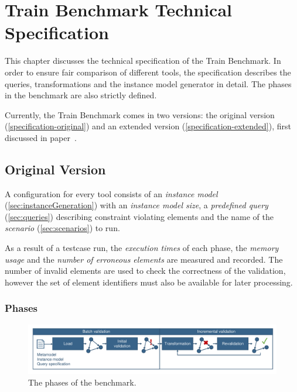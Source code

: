 \chapter{Train Benchmark Technical Specification}

This chapter discusses the technical specification of the Train Benchmark. In order to ensure fair comparison of different tools, the specification describes the queries, transformations and the instance model generator in detail. The phases in the benchmark are also strictly defined.

Currently, the Train Benchmark comes in two versions: the original version (\autoref{specification-original}) and an extended version (\autoref{specification-extended}), first discussed in paper~\cite{TB:ASE2013}.
 
\section{Original Version}
\label{specification-original}

A  configuration for every tool consists of an \emph{instance model} (\autoref{sec:instanceGeneration}) with an \emph{instance model size}, a \emph{predefined query} (\autoref{sec:queries}) describing constraint violating elements and the name of the \emph{scenario} (\autoref{sec:scenarios}) to run.

As a result of a testcase run, the \emph{execution times} of each phase, the \emph{memory usage} and the \emph{number of erroneous elements} are measured and recorded. The number of invalid elements are used to check the correctness of the validation, however the set of element identifiers must also be available for later processing. 


\subsection{Phases}
\label{sec:phases}

\begin{figure}[Htb]
	\centering
	\includegraphics[width=\textwidth]{figures/trainbenchmark-sequence}
	\caption{The phases of the benchmark.}
	\label{fig:phases}
\end{figure}

